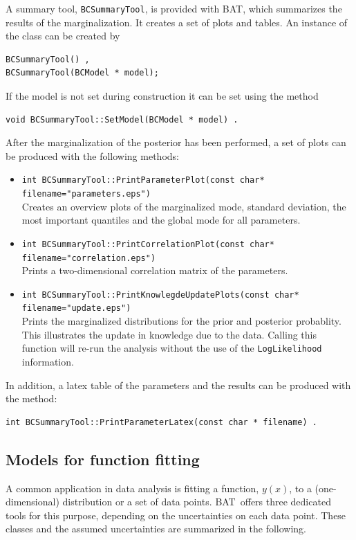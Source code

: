 \documentclass[11pt, a4paper]{article}
\newcommand{\bat}{{\sc BAT}}
\newcommand{\BAT}{\bat}
\begin{document}
A summary tool, \verb|BCSummaryTool|, is provided with \BAT, which
summarizes the results of the marginalization. It creates a set of
plots and tables. An instance of the class can be created by
%
\begin{verbatim}
BCSummaryTool() ,
BCSummaryTool(BCModel * model);
\end{verbatim}
%
If the model is not set during construction it can be set using the
method
%
\begin{verbatim}
void BCSummaryTool::SetModel(BCModel * model) .
\end{verbatim}

After the marginalization of the posterior has been performed, a
set of plots can be produced with the following methods:
%
\begin{itemize}
\item \verb|int BCSummaryTool::PrintParameterPlot(const char* filename="parameters.eps")|\\
  Creates an overview plots of the marginalized mode, standard
  deviation, the most important quantiles and the global mode for all
  parameters.

\item \verb|int BCSummaryTool::PrintCorrelationPlot(const char* filename="correlation.eps")|\\
  Prints a two-dimensional correlation matrix of the parameters.

\item \verb|int BCSummaryTool::PrintKnowlegdeUpdatePlots(const char* filename="update.eps")|\\
  Prints the marginalized distributions for the prior and posterior
  probablity. This illustrates the update in knowledge due to the
  data. Calling this function will re-run the analysis without the use
  of the \verb|LogLikelihood| information.
\end{itemize}

In addition, a latex table of the parameters and the results can be
produced with the method:
%
\begin{verbatim}
int BCSummaryTool::PrintParameterLatex(const char * filename) .
\end{verbatim}

\subsection{Models for function fitting}
\label{subsection:fitting}

A common application in data analysis is fitting a function, $y(x)$,
to a (one-dimensional) distribution or a set of data
points. \bat\ offers three dedicated tools for this purpose, depending
on the uncertainties on each data point. These classes and the assumed
uncertainties are summarized in the following.
\end{document}
